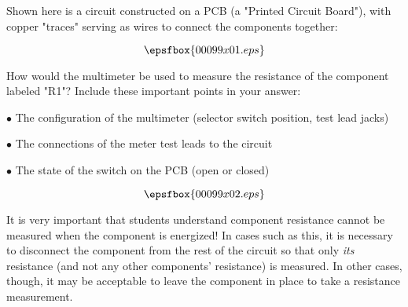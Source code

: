 

Shown here is a circuit constructed on a PCB (a "Printed Circuit Board"), with copper "traces" serving as wires to connect the components together:

$$\epsfbox{00099x01.eps}$$

How would the multimeter be used to measure the resistance of the component labeled "R1"?  Include these important points in your answer:

\item {$\bullet$} The configuration of the multimeter (selector switch position, test lead jacks)
\item {$\bullet$} The connections of the meter test leads to the circuit
\item {$\bullet$} The state of the switch on the PCB (open or closed)







$$\epsfbox{00099x02.eps}$$







It is very important that students understand component resistance cannot be measured when the component is energized!  In cases such as this, it is necessary to disconnect the component from the rest of the circuit so that only {\it its} resistance (and not any other components' resistance) is measured.  In other cases, though, it may be acceptable to leave the component in place to take a resistance measurement.





